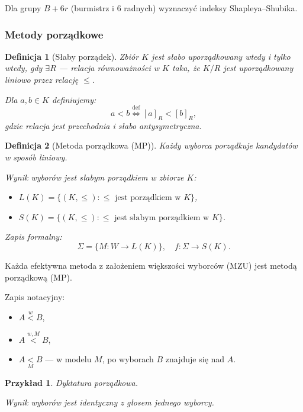 \documentclass[12pt,a4paper]{article}
\theoremstyle{break}
\newtheorem{definition}{Definicja}[section]
\newtheorem{example}{Przykład}[section]
\begin{document}
	\begin{zad}
		Dla grupy $B + 6r$ (burmistrz i 6 radnych) wyznaczyć indeksy Shapleya–Shubika.
	\end{zad}
	
	\subsubsection{Metody porządkowe}
	
	\begin{definition}[Słaby porządek]
		Zbiór $K$ jest słabo uporządkowany wtedy i tylko wtedy, gdy $\exists R$ — relacja równoważności w $K$ taka, że $K / R$ jest uporządkowany liniowo przez relację $\leq$. 
		
		Dla $a, b \in K$ definiujemy: 
		\[
		a < b \overset{\text{def}}{\Leftrightarrow} [a]_R < [b]_R,
		\]
		gdzie relacja jest przechodnia i słabo antysymetryczna.
	\end{definition}
	
	\begin{definition}[Metoda porządkowa (MP)]
		Każdy wyborca porządkuje kandydatów w sposób liniowy.
		
		Wynik wyborów jest słabym porządkiem w zbiorze $K$:
		\begin{itemize}
			\item $L(K) = \{(K, \leq) : \leq \text{ jest porządkiem w } K\}$,
			\item $S(K) = \{(K, \leq) : \leq \text{ jest słabym porządkiem w } K\}$.
		\end{itemize}
		
		Zapis formalny:
		\[
		\Sigma = \{ M : W \rightarrow L(K) \}, \quad f : \Sigma \rightarrow S(K).
		\]
	\end{definition}
	
	Każda efektywna metoda z założeniem większości wyborców (MZU) jest metodą porządkową (MP).
	
	Zapis notacyjny:
	\begin{itemize}
		\item $A \overset{w}{<} B$, 
		\item $A \overset{w, M}{<} B$, 
		\item $A \underset{M}{<} B$ — w modelu $M$, po wyborach $B$ znajduje się nad $A$.
	\end{itemize}
	
	\begin{example}
		Dyktatura porządkowa.  
		
		Wynik wyborów jest identyczny z głosem jednego wyborcy.
	\end{example}
	
\end{document}
